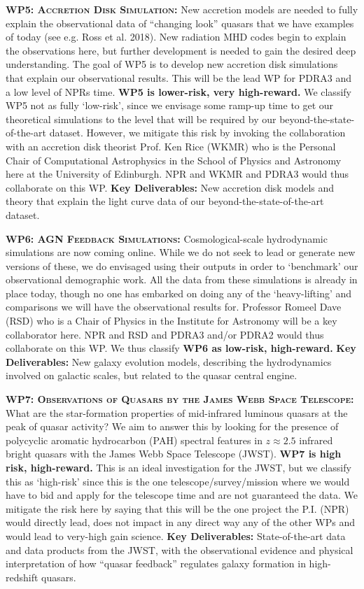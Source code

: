 \documentclass[oneside, a4paper, onecolumn, 11pt]{article}
\begin{document}
\smallskip
\smallskip
\noindent
\textbf{\textsc{WP5: Accretion Disk Simulation:}} 
New accretion models are needed to fully explain the observational
data of ``changing look'' quasars that we have examples of today (see
e.g. Ross et al. 2018). New radiation MHD codes begin to explain the
observations here, but further development is needed to gain the
desired deep understanding. 
The goal of WP5 is to develop new accretion disk simulations that
explain our observational results.  This will be the lead WP for 
PDRA3 and a low level of NPRs time. 
{\bf WP5 is lower-risk, very high-reward.} We
classify WP5 not as fully `low-risk', since we envisage some ramp-up
time to get our theoretical simulations to the level that will be required by 
our beyond-the-state-of-the-art dataset. However, we mitigate this risk
by invoking the collaboration with an accretion disk theorist
Prof. Ken Rice (WKMR) who is the Personal Chair of Computational
Astrophysics in the School of Physics and Astronomy here at the
University of Edinburgh. NPR and WKMR and PDRA3 would thus collaborate 
on this WP. 
{\bf Key Deliverables:} New accretion disk models and theory that explain the 
light curve data of our beyond-the-state-of-the-art dataset. 


\smallskip
\smallskip
\noindent
\textbf{\textsc{WP6: AGN Feedback Simulations:}} 
Cosmological-scale hydrodynamic simulations are now coming online. 
While we do not seek to lead or generate new versions of these, we do 
envisaged using their outputs in order to `benchmark' our observational 
demographic work. 
All the data from these simulations is already in place today, though no one 
has embarked on doing any of the `heavy-lifting' and comparisons we will 
have the observational results for. Professor Romeel Dave (RSD) who is a Chair of Physics 
in the Institute for Astronomy will be a key collaborator here. 
NPR and RSD and PDRA3 and/or PDRA2 would thus collaborate on this WP. 
We thus classify {\bf WP6 as low-risk, high-reward.}
{\bf Key Deliverables:} New galaxy evolution models, describing the hydrodynamics 
involved on galactic scales, but related to the quasar central engine. 


\smallskip
\smallskip
\noindent
\textbf{\textsc{WP7: Observations of Quasars by the James Webb Space Telescope:}} 
What are the star-formation properties of mid-infrared luminous quasars at the peak of quasar activity? 
We aim to answer this by looking for the presence of polycyclic aromatic hydrocarbon (PAH) spectral features 
in $z \approx 2.5$ infrared bright quasars with the James Webb Space Telescope (JWST). 
{\bf WP7 is high risk, high-reward.}
This is an ideal investigation for the JWST, but we classify this as
`high-risk' since this is the one telescope/survey/mission where we
would have to bid and apply for the telescope time and are not guaranteed
the data. We mitigate the risk here by saying that this will be the
one project the P.I. (NPR) would directly lead, does not impact in any direct way any of
the other WPs and would lead to very-high gain science.
{\bf Key Deliverables:} State-of-the-art data and data products from the JWST, with the observational evidence and physical interpretation of how ``quasar feedback'' regulates galaxy formation in high-redshift quasars. 
\end{document}
